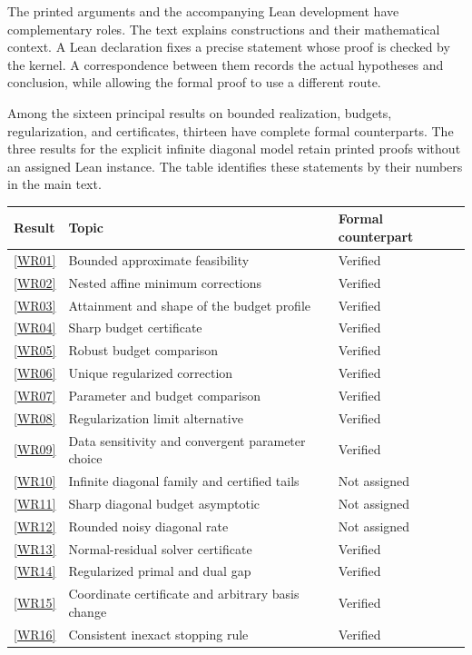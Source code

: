 \clearpage
{}\label{app:written}
The printed arguments and the accompanying Lean development have complementary roles. The text explains constructions and their mathematical context. A Lean declaration fixes a precise statement whose proof is checked by the kernel. A correspondence between them records the actual hypotheses and conclusion, while allowing the formal proof to use a different route.

Among the sixteen principal results on bounded realization, budgets, regularization, and certificates, thirteen have complete formal counterparts. The three results for the explicit infinite diagonal model retain printed proofs without an assigned Lean instance. The table identifies these statements by their numbers in the main text.

\begin{longtable}{@{}p{.11\linewidth}p{.60\linewidth}p{.22\linewidth}@{}}
\toprule Result & Topic & Formal counterpart\\\midrule\endhead
\ref{WR01} & Bounded approximate feasibility & Verified\\[4pt]
\ref{WR02} & Nested affine minimum corrections & Verified\\[4pt]
\ref{WR03} & Attainment and shape of the budget profile & Verified\\[4pt]
\ref{WR04} & Sharp budget certificate & Verified\\[4pt]
\ref{WR05} & Robust budget comparison & Verified\\[4pt]
\ref{WR06} & Unique regularized correction & Verified\\[4pt]
\ref{WR07} & Parameter and budget comparison & Verified\\[4pt]
\ref{WR08} & Regularization limit alternative & Verified\\[4pt]
\ref{WR09} & Data sensitivity and convergent parameter choice & Verified\\[4pt]
\ref{WR10} & Infinite diagonal family and certified tails & Not assigned\\[4pt]
\ref{WR11} & Sharp diagonal budget asymptotic & Not assigned\\[4pt]
\ref{WR12} & Rounded noisy diagonal rate & Not assigned\\[4pt]
\ref{WR13} & Normal-residual solver certificate & Verified\\[4pt]
\ref{WR14} & Regularized primal and dual gap & Verified\\[4pt]
\ref{WR15} & Coordinate certificate and arbitrary basis change & Verified\\[4pt]
\ref{WR16} & Consistent inexact stopping rule & Verified\\
\bottomrule\end{longtable}

